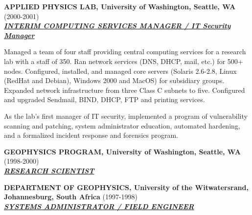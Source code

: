 \documentclass{article}
\newcommand{\employer}[3]{{ \textbf{#1} (#2)\\ \underline{\textbf{\emph{#3}}}\\  }}
\newenvironment{achievements}{\begin{list}{\topsep 0pt \itemsep -2pt}} {\vspace*{4pt}\end{list}}
\begin{document}
\employer{APPLIED PHYSICS LAB, University of Washington, Seattle, WA
}{2000-2001}{INTERIM COMPUTING SERVICES MANAGER / IT Security Manager}
\begin{achievements}
    \item Managed a team of four staff providing central computing services for a research lab with a staff of 350. Ran network services (DNS, DHCP, mail, etc.) for 500+ nodes. Configured, installed, and managed core servers (Solaris 2.6-2.8, Linux (RedHat and Debian), Windows 2000 and MacOS) for subsidiary groups.  Expanded network infrastructure from three Class C subnets to five.  Configured and upgraded Sendmail, BIND, DHCP, FTP and printing services.
    \item As the lab's first manager of IT security, implemented a program of vulnerability scanning and patching, system administrator education, automated hardening, and a formalized incident response and forensics program.
\end{achievements}

\employer{GEOPHYSICS PROGRAM, University of Washington, Seattle, WA}{1998-2000}{RESEARCH SCIENTIST}

\employer{DEPARTMENT OF GEOPHYSICS, University of the Witwatersrand,
Johannesburg, South Africa}{1997-1998}{SYSTEMS ADMINISTRATOR / FIELD ENGINEER}
\end{document}

